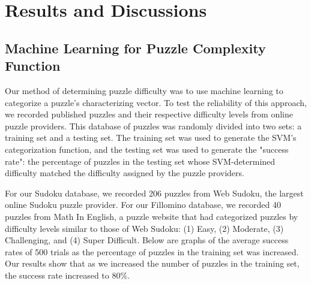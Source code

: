 \section{Results and Discussions}

\subsection{Machine Learning for Puzzle Complexity Function}

Our method of determining puzzle difficulty was to use machine learning to categorize a puzzle's characterizing vector. To test the reliability of this approach, we recorded published puzzles and their respective difficulty levels from online puzzle providers. This database of puzzles was randomly divided into two sets: a training set and a testing set. The training set was used to generate the SVM's categorization function, and the testing set was used to generate the "success rate": the percentage of puzzles in the testing set whose SVM-determined difficulty matched the difficulty assigned by the puzzle providers. 

For our Sudoku database, we recorded 206 puzzles from Web Sudoku, the largest online Sudoku puzzle provider. For our Fillomino database, we recorded 40 puzzles from Math In English, a puzzle website that had categorized puzzles by difficulty levels similar to those of Web Sudoku: (1) Easy, (2) Moderate, (3) Challenging, and (4) Super Difficult. Below are graphs of the average success rates of 500 trials as the percentage of puzzles in the training set was increased. Our results show that as we increased the number of puzzles in the training set, the success rate increased to $80 \%$.

